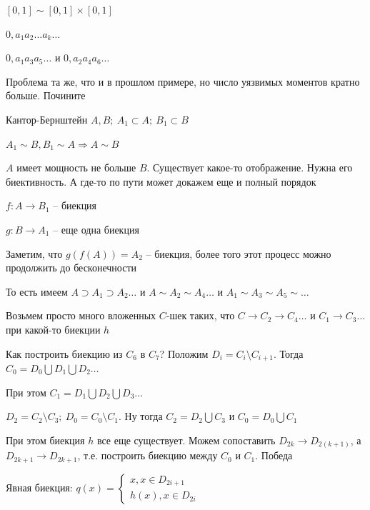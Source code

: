 \documentclass[12pt]{article}
\begin{document}
\begin{Example}{}
    $[0, 1] \sim [0, 1] \times [0, 1]$

    $0, a_1a_2 \ldots a_k \ldots$

    $0, a_1a_3a_5 \ldots$ и $0, a_2a_4a_6 \ldots$

    \begin{Exercise}{}
        Проблема та же, что и в прошлом примере, но число уязвимых моментов кратно больше. Почините
    \end{Exercise}
\end{Example}

\begin{theo}{Кантор-Бернштейн}
    $A, B;\ A_1 \subset A;\ B_1 \subset B$

    $A_1 \sim B, B_1 \sim A \Rightarrow A \sim B$
\end{theo}

\begin{Proof}{}

$A$ имеет мощность не больше $B$. Существует какое-то отображение. Нужна его биективность. А где-то по пути может докажем еще и полный порядок

$f: A \rightarrow B_1$ -- биекция

$g : B \rightarrow A_1$ -- еще одна биекция

Заметим, что $g(f(A)) = A_2$ -- биекция, более того этот процесс можно продолжить до бесконечности 

То есть имеем $A \supset A_1 \supset A_2 \ldots$ и $A \sim A_2 \sim A_4 \ldots$ и $A_1 \sim A_3 \sim A_5 \sim \ldots$

Возьмем просто много вложенных $C$-шек таких, что $C \rightarrow C_2 \rightarrow C_4 \ldots$ и $C_1 \rightarrow C_3 \ldots$ при какой-то биекции $h$

Как построить биекцию из $C_6$ в $C_7$? Положим $D_i = C_i \setminus C_{i + 1}$. Тогда $C_0 = D_0 \bigcup D_1 \bigcup D_2 \ldots$

При этом $C_1 = D_1 \bigcup D_2 \bigcup D_3 \ldots$

$D_2 = C_2 \setminus C_3;\ D_0 = C_0 \setminus C_1$. Ну тогда $C_2 = D_2 \bigcup C_3$ и $C_0 = D_0 \bigcup C_1$

При этом биекция $h$ все еще существует. Можем сопоставить $D_{2k} \rightarrow D_{2(k + 1)}$, а $D_{2k + 1} \rightarrow D_{2k + 1}$, т.е. построить биекцию между $C_0$ и $C_1$. Победа

Явная биекция: $q(x) = \begin{cases}
    x, x \in D_{2i + 1} \\
    h(x), x \in D_{2i}
\end{cases}$

\end{Proof}
\end{document}

